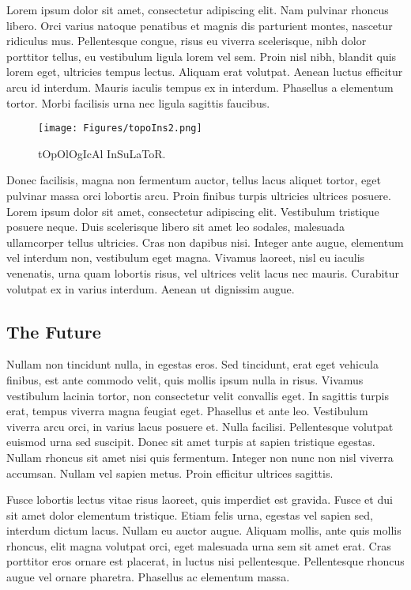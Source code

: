 Lorem ipsum dolor sit amet, consectetur adipiscing elit. Nam pulvinar rhoncus libero. Orci varius natoque penatibus et magnis dis parturient montes, nascetur ridiculus mus. Pellentesque congue, risus eu viverra scelerisque, nibh dolor porttitor tellus, eu vestibulum ligula lorem vel sem. Proin nisl nibh, blandit quis lorem eget, ultricies tempus lectus. Aliquam erat volutpat. Aenean luctus efficitur arcu id interdum. Mauris iaculis tempus ex in interdum. Phasellus a elementum tortor. Morbi facilisis urna nec ligula sagittis faucibus.
    
    \begin{figure}
        \centering
        \texttt{[image: Figures/topoIns2.png]}
        \caption{tOpOlOgIcAl InSuLaToR. }
        \label{fig:topoIns2}
    \end{figure}
    
Donec facilisis, magna non fermentum auctor, tellus lacus aliquet tortor, eget pulvinar massa orci lobortis arcu. Proin finibus turpis ultricies ultrices posuere. Lorem ipsum dolor sit amet, consectetur adipiscing elit. Vestibulum tristique posuere neque. Duis scelerisque libero sit amet leo sodales, malesuada ullamcorper tellus ultricies. Cras non dapibus nisi. Integer ante augue, elementum vel interdum non, vestibulum eget magna. Vivamus laoreet, nisl eu iaculis venenatis, urna quam lobortis risus, vel ultrices velit lacus nec mauris. Curabitur volutpat ex in varius interdum. Aenean ut dignissim augue.

\subsection{The Future}

Nullam non tincidunt nulla, in egestas eros. Sed tincidunt, erat eget vehicula finibus, est ante commodo velit, quis mollis ipsum nulla in risus. Vivamus vestibulum lacinia tortor, non consectetur velit convallis eget. In sagittis turpis erat, tempus viverra magna feugiat eget. Phasellus et ante leo. Vestibulum viverra arcu orci, in varius lacus posuere et. Nulla facilisi. Pellentesque volutpat euismod urna sed suscipit. Donec sit amet turpis at sapien tristique egestas. Nullam rhoncus sit amet nisi quis fermentum. Integer non nunc non nisl viverra accumsan. Nullam vel sapien metus. Proin efficitur ultrices sagittis.

    
Fusce lobortis lectus vitae risus laoreet, quis imperdiet est gravida. Fusce et dui sit amet dolor elementum tristique. Etiam felis urna, egestas vel sapien sed, interdum dictum lacus. Nullam eu auctor augue. Aliquam mollis, ante quis mollis rhoncus, elit magna volutpat orci, eget malesuada urna sem sit amet erat. Cras porttitor eros ornare est placerat, in luctus nisi pellentesque. Pellentesque rhoncus augue vel ornare pharetra. Phasellus ac elementum massa.

